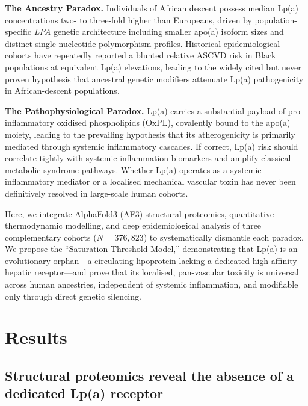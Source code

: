 \documentclass[11pt,a4paper]{article}
\newcommand{\lpa}{Lp(a)}
\begin{document}
\textbf{The Ancestry Paradox.} Individuals of African descent possess median \lpa{} concentrations two- to three-fold higher than Europeans, driven by population-specific \textit{LPA} genetic architecture including smaller apo(a) isoform sizes and distinct single-nucleotide polymorphism profiles\cite{deo2022,coassin2019}. Historical epidemiological cohorts have repeatedly reported a blunted relative ASCVD risk in Black populations at equivalent \lpa{} elevations, leading to the widely cited but never proven hypothesis that ancestral genetic modifiers attenuate \lpa{} pathogenicity in African-descent populations\cite{virani2012,patel2021}.

\textbf{The Pathophysiological Paradox.} \lpa{} carries a substantial payload of pro-inflammatory oxidised phospholipids (OxPL), covalently bound to the apo(a) moiety, leading to the prevailing hypothesis that its atherogenicity is primarily mediated through systemic inflammatory cascades\cite{tsimikas2005,boffa2019}. If correct, \lpa{} risk should correlate tightly with systemic inflammation biomarkers and amplify classical metabolic syndrome pathways. Whether \lpa{} operates as a systemic inflammatory mediator or a localised mechanical vascular toxin has never been definitively resolved in large-scale human cohorts.

Here, we integrate AlphaFold3 (AF3) structural proteomics\cite{abramson2024}, quantitative thermodynamic modelling, and deep epidemiological analysis of three complementary cohorts ($N = 376{,}823$) to systematically dismantle each paradox. We propose the ``Saturation Threshold Model,'' demonstrating that \lpa{} is an evolutionary orphan---a circulating lipoprotein lacking a dedicated high-affinity hepatic receptor---and prove that its localised, pan-vascular toxicity is universal across human ancestries, independent of systemic inflammation, and modifiable only through direct genetic silencing.

\section*{Results}

\subsection*{Structural proteomics reveal the absence of a dedicated \lpa{} receptor}
\end{document}
